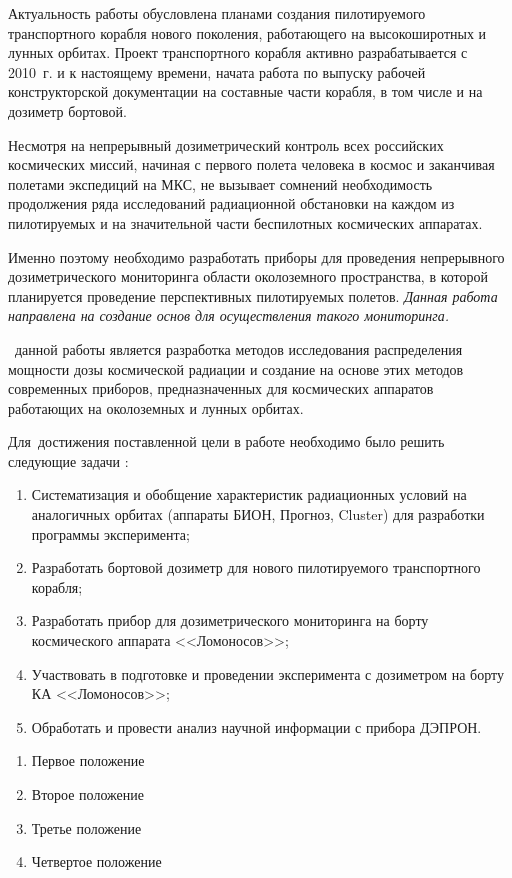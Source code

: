 {\actuality}
 Актуальность работы обусловлена планами создания пилотируемого транспортного корабля нового поколения, работающего на высокоширотных и лунных орбитах. Проект транспортного корабля активно разрабатывается с 2010~г. и к настоящему времени, начата работа по выпуску рабочей конструкторской документации на составные части корабля, в том числе и на дозиметр бортовой.
 
 Несмотря на непрерывный дозиметрический контроль всех российских космических миссий, начиная с первого полета человека в космос и заканчивая полетами экспедиций на МКС, не вызывает сомнений необходимость продолжения ряда исследований радиационной обстановки на каждом из пилотируемых и на значительной части беспилотных космических аппаратах.  
 
 Именно поэтому необходимо разработать приборы  для проведения непрерывного дозиметрического мониторинга области околоземного пространства, в которой планируется проведение перспективных пилотируемых полетов. \textit{Данная работа направлена на создание основ для осуществления такого мониторинга.}

 \aim\ данной работы является разработка методов исследования распределения мощности дозы космической радиации и создание на основе этих методов современных приборов, предназначенных для космических аппаратов работающих на околоземных и лунных орбитах.
  

Для~достижения поставленной цели в работе необходимо было решить следующие задачи {\tasks}:
\begin{enumerate}
  \item Систематизация и обобщение характеристик радиационных условий на аналогичных орбитах (аппараты БИОН, Прогноз, Cluster) для разработки программы эксперимента;
  \item Разработать бортовой дозиметр для нового пилотируемого транспортного корабля;
  \item Разработать прибор для дозиметрического мониторинга на борту космического аппарата <<Ломоносов>>;
  \item Участвовать в подготовке и проведении эксперимента с дозиметром на борту КА <<Ломоносов>>;
  \item Обработать и провести анализ научной информации с прибора ДЭПРОН.
  
\end{enumerate}

\begin{enumerate}
  \item Первое положение
  \item Второе положение
  \item Третье положение
  \item Четвертое положение
\end{enumerate}

